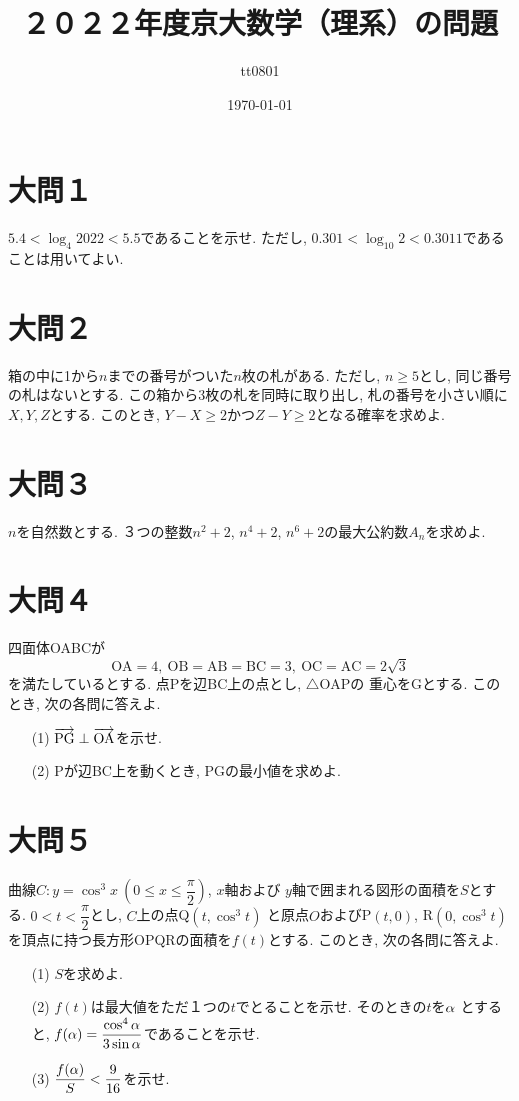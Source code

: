 \documentclass[dvipdfmx,a4paper]{jsarticle}
\title{２０２２年度京大数学（理系）の問題}
\author{tt0801}
\date{\today}
\begin{document}
    \maketitle
    \section{大問１}
    $5.4 < \log_4 2022 < 5.5$であることを示せ. ただし, $0.301 < \log_{10} 2 < 0.3011$であることは用いてよい. 

    \section{大問２}
    箱の中に1から$n$までの番号がついた$n$枚の札がある. ただし, $n\geq 5$とし, 同じ番号の札はないとする. 
    この箱から3枚の札を同時に取り出し, 札の番号を小さい順に$X, Y, Z$とする. このとき, 
    $Y-X \geq 2$かつ$Z-Y \geq 2$となる確率を求めよ. 



    \section{大問３}
    $n$を自然数とする. ３つの整数$n^2+2$, $n^4+2$, $n^6+2$の最大公約数$A_n$を求めよ. 


    \section{大問４}
    四面体OABCが
    \begin{equation*}
        \mathrm{
            OA = 4,\ OB=AB=BC=3,\ OC=AC=2\sqrt{3}
        }
    \end{equation*}
    を満たしているとする. 点Pを辺BC上の点とし, $\triangle \mathrm{OAP}$の
    重心をGとする. このとき, 次の各問に答えよ. 
    \begin{itemize}
        \item [(1)] $\overrightarrow{\mathrm{PG}} \perp \overrightarrow{\mathrm{OA}}$を示せ. 
        \item [(2)] Pが辺BC上を動くとき, PGの最小値を求めよ. 
    \end{itemize}

    
    \section{大問５}
    曲線$C: y=\cos ^3 x \ \left(0 \leq x \leq \dfrac{\pi}{2}\right)$, $x$軸および
    $y$軸で囲まれる図形の面積を$S$とする. $0<t<\dfrac{\pi}{2}$とし, $C$上の点Q$(t, \cos ^3 t)$
    と原点$O$およびP$(t,0)$, R$(0, \cos ^3 t)$を頂点に持つ長方形OPQRの面積を$f(t)$とする. 
    このとき, 次の各問に答えよ. 
    \begin{itemize}
        \item [(1)] $S$を求めよ. 
        \item [(2)] $f(t)$は最大値をただ１つの$t$でとることを示せ. そのときの$t$を$\alpha$
        とすると, $f(\alpha) = \dfrac{\cos ^4 \alpha}{3 \sin \alpha}$であることを示せ. 
        \item [(3)] $\dfrac{f(\alpha)}{S} < \dfrac{9}{16}$を示せ. 
    \end{itemize}
\end{document}
